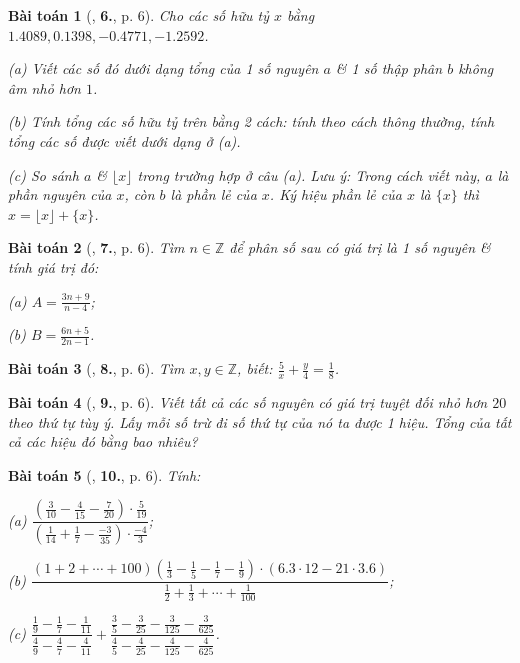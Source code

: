 \documentclass{article}
\numberwithin{equation}{section}
\newtheorem{baitoan}{Bài toán}[section]
\begin{document}
\begin{baitoan}[\cite{Binh_Toan_7_tap_1}, \textbf{6.}, p. 6]
	Cho các số hữu tỷ $x$ bằng $1.4089, 0.1398, -0.4771, -1.2592$.
	\begin{enumerate*}
		\item[(a)] Viết các số đó dưới dạng tổng của 1 số nguyên $a$ \& 1 số thập phân $b$ không âm nhỏ hơn $1$.
		\item[(b)] Tính tổng các số hữu tỷ trên bằng 2 cách: tính theo cách thông thường, tính tổng các số được viết dưới dạng ở (a).
		\item[(c)] So sánh $a$ \& $\lfloor x\rfloor$ trong trường hợp ở câu (a). Lưu ý: Trong cách viết này, $a$ là \emph{phần nguyên} của $x$, còn $b$ là \emph{phần lẻ} của $x$. Ký hiệu phần lẻ của $x$ là $\{x\}$ thì $x = \lfloor x\rfloor + \{x\}$.
	\end{enumerate*}
\end{baitoan}

\begin{baitoan}[\cite{Binh_Toan_7_tap_1}, \textbf{7.}, p. 6]
	Tìm $n\in\mathbb{Z}$ để phân số sau có giá trị là 1 số nguyên \& tính giá trị đó:
	\begin{enumerate*}
		\item[(a)] $A = \frac{3n + 9}{n - 4}$;
		\item[(b)] $B = \frac{6n + 5}{2n - 1}$.
	\end{enumerate*}
\end{baitoan}

\begin{baitoan}[\cite{Binh_Toan_7_tap_1}, \textbf{8.}, p. 6]
	Tìm $x,y\in\mathbb{Z}$, biết: $\frac{5}{x} + \frac{y}{4} = \frac{1}{8}$.
\end{baitoan}

\begin{baitoan}[\cite{Binh_Toan_7_tap_1}, \textbf{9.}, p. 6]
	Viết tất cả các số nguyên có giá trị tuyệt đối nhỏ hơn $20$ theo thứ tự tùy ý. Lấy mỗi số trừ đi số thứ tự của nó ta được 1 hiệu. Tổng của tất cả các hiệu đó bằng bao nhiêu?
\end{baitoan}

\begin{baitoan}[\cite{Binh_Toan_7_tap_1},  \textbf{10.}, p. 6]
	Tính:
	\begin{enumerate*}
		\item[(a)] $\dfrac{\left(\frac{3}{10} - \frac{4}{15} - \frac{7}{20}\right)\cdot\frac{5}{19}}{\left(\frac{1}{14} + \frac{1}{7} - \frac{-3}{35}\right)\cdot\frac{-4}{3}}$;
		\item[(b)] $\dfrac{(1 + 2 + \cdots + 100)\left(\frac{1}{3} - \frac{1}{5} - \frac{1}{7} - \frac{1}{9}\right)\cdot(6.3\cdot 12 - 21\cdot 3.6)}{\frac{1}{2} + \frac{1}{3} + \cdots + \frac{1}{100}}$;
		\item[(c)] $\dfrac{\frac{1}{9} - \frac{1}{7} - \frac{1}{11}}{\frac{4}{9} - \frac{4}{7} - \frac{4}{11}} + \dfrac{\frac{3}{5} - \frac{3}{25} - \frac{3}{125} - \frac{3}{625}}{\frac{4}{5} - \frac{4}{25} - \frac{4}{125} - \frac{4}{625}}$.
	\end{enumerate*}
\end{baitoan}
\end{document}
